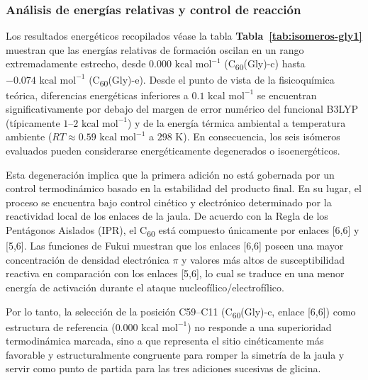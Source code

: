 \subsubsection{Análisis de energías relativas y control de reacción}

Los resultados energéticos recopilados véase la tabla \textbf{Tabla~\ref{tab:isomeros-gly1}} muestran que las energías relativas de formación oscilan en un rango extremadamente estrecho, desde $0.000\text{ kcal mol}^{-1}$ (C\textsubscript{60}(Gly)-c) hasta $-0.074\text{ kcal mol}^{-1}$ (C\textsubscript{60}(Gly)-e). Desde el punto de vista de la fisicoquímica teórica, diferencias energéticas inferiores a $0.1\text{ kcal mol}^{-1}$ se encuentran significativamente por debajo del margen de error numérico del funcional B3LYP (típicamente $1\text{--}2\text{ kcal mol}^{-1}$) y de la energía térmica ambiental a temperatura ambiente ($RT \approx 0.59\text{ kcal mol}^{-1}$ a $298\text{ K}$). En consecuencia, los seis isómeros evaluados pueden considerarse energéticamente degenerados o isoenergéticos.

Esta degeneración implica que la primera adición no está gobernada por un control termodinámico basado en la estabilidad del producto final. En su lugar, el proceso se encuentra bajo control cinético y electrónico determinado por la reactividad local de los enlaces de la jaula. De acuerdo con la Regla de los Pentágonos Aislados (IPR), el C\textsubscript{60} está compuesto únicamente por enlaces [6,6] y [5,6]. Las funciones de Fukui muestran que los enlaces [6,6] poseen una mayor concentración de densidad electrónica $\pi$ y valores más altos de susceptibilidad reactiva en comparación con los enlaces [5,6], lo cual se traduce en una menor energía de activación durante el ataque nucleofílico/electrofílico.

Por lo tanto, la selección de la posición C59--C11 (C\textsubscript{60}(Gly)-c, enlace [6,6]) como estructura de referencia ($0.000\text{ kcal mol}^{-1}$) no responde a una superioridad termodinámica marcada, sino a que representa el sitio cinéticamente más favorable y estructuralmente congruente para romper la simetría de la jaula y servir como punto de partida para las tres adiciones sucesivas de glicina.

